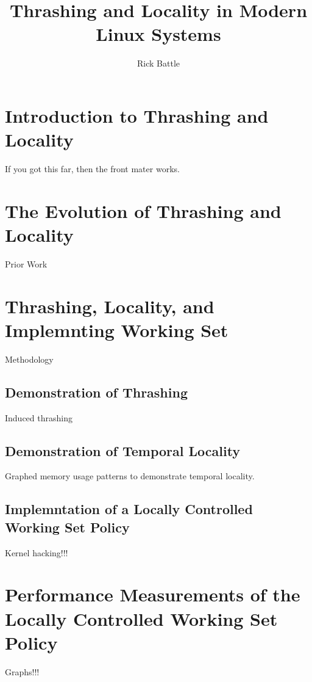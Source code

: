 \documentclass[twoside,thesis,twoadvisors]{npsreport}
\title{Thrashing and Locality in Modern Linux Systems}
\author{Rick Battle}
\begin{document}
\NPScover                       %
\NPSsftne                       %
\NPSthesistitle                 %
\NPSabstractpage                %
\NPSfrontmatter                 %


\renewcommand{\chaptermark}[1]{\markboth{\MakeUppercase{\chaptername}\ \thechapter.\ #1}{}}
\NPStableOfContents
\NPSlistOfFigures
\NPSlistOfTables



\NPSbody

\chapter{Introduction to Thrashing and Locality}

If you got this far, then the front mater works.

\chapter{The Evolution of Thrashing and Locality}
Prior Work

\chapter{Thrashing, Locality, and Implemnting Working Set}
Methodology

\section{Demonstration of Thrashing}
Induced thrashing

\section{Demonstration of Temporal Locality}
Graphed memory usage patterns to demonstrate temporal locality.

\section{Implemntation of a Locally Controlled Working Set Policy}
Kernel hacking!!!

\chapter{Performance Measurements of the Locally Controlled Working Set Policy}
Graphs!!!
\end{document}
